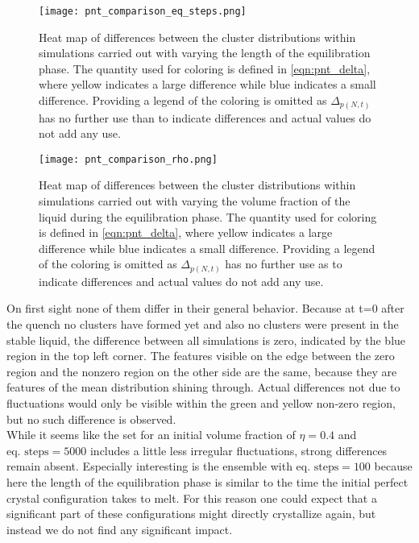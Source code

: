 \begin{figure}[h!]
\centering
\texttt{[image: pnt\_comparison\_eq\_steps.png]}
\caption[Heat maps of differences under variation of equilibration step number]{Heat map of differences between the cluster distributions within simulations carried out with varying the length of the equilibration phase. The quantity used for coloring is defined in \autoref{eqn:pnt_delta}, where yellow indicates a large difference while blue indicates a small difference. Providing a legend of the coloring is omitted as $\Delta_{p(N,t)}$ has no further use than to indicate differences and actual values do not add any use.}
\label{fig:pnt_eq_step_comparison}
\end{figure}


\begin{figure}[h!]
\centering
\texttt{[image: pnt\_comparison\_rho.png]}
\caption[Heat maps of differences under variation of initial density]{Heat map of differences between the cluster distributions within simulations carried out with varying the volume fraction of the liquid during the equilibration phase. The quantity used for coloring is defined in \autoref{eqn:pnt_delta}, where yellow indicates a large difference while blue indicates a small difference. Providing a legend of the coloring is omitted as $\Delta_{p(N,t)}$ has no further use as to indicate differences and actual values do not add any use.}
\label{fig:pnt_rho_comparison}
\end{figure}

On first sight none of them differ in their general behavior. Because at t=0 after the quench no clusters have formed yet and also no clusters were present in the stable liquid, the difference between all simulations is zero, indicated by the blue region in the top left corner. The features visible on the edge between the zero region and the nonzero region on the other side are the same, because they are features of the mean distribution shining through. Actual differences not due to fluctuations would only be visible within the green and yellow non-zero region, but no such difference is observed.\\

While it seems like the set for an initial volume fraction of $\eta=0.4$ and $\text{eq. steps} = 5000$ includes a little less irregular fluctuations, strong differences remain absent. Especially interesting is the ensemble with $\text{eq. steps} = 100$ because here the length of the equilibration phase is similar to the time the initial perfect crystal configuration takes to melt. For this reason one could expect that a significant part of these configurations might directly crystallize again, but instead we do not find any significant impact.\\

